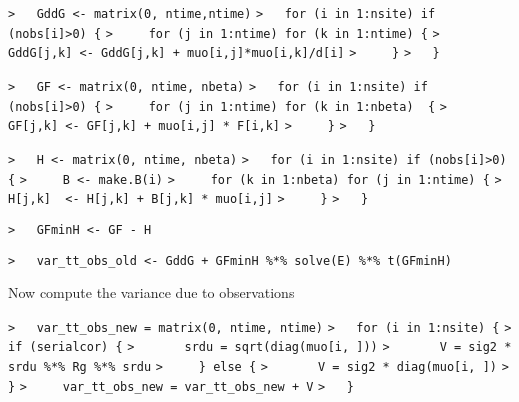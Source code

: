 \documentclass[a4paper]{article}
\begin{document}
\verb~>   GddG <- matrix(0, ntime,ntime)~\newline
\verb~>   for (i in 1:nsite) if (nobs[i]>0) {~\newline
\verb~>     for (j in 1:ntime) for (k in 1:ntime) {~\newline
\verb~>       GddG[j,k] <- GddG[j,k] + muo[i,j]*muo[i,k]/d[i]~\newline
\verb~>     }~\newline
\verb~>   }~\par

\verb~>   GF <- matrix(0, ntime, nbeta)~\newline
\verb~>   for (i in 1:nsite) if (nobs[i]>0) {~\newline
\verb~>     for (j in 1:ntime) for (k in 1:nbeta)  {~\newline
\verb~>       GF[j,k] <- GF[j,k] + muo[i,j] * F[i,k]~\newline
\verb~>     }~\newline
\verb~>   }~\par

\verb~>   H <- matrix(0, ntime, nbeta)~\newline
\verb~>   for (i in 1:nsite) if (nobs[i]>0) {~\newline
\verb~>     B <- make.B(i)~\newline
\verb~>     for (k in 1:nbeta) for (j in 1:ntime) {~\newline
\verb~>       H[j,k]  <- H[j,k] + B[j,k] * muo[i,j]~\newline
\verb~>     }~\newline
\verb~>   }~\par

\verb~>   GFminH <- GF - H~\par

\verb~>   var_tt_obs_old <- GddG + GFminH %*% solve(E) %*% t(GFminH)~\par

Now compute the variance due to observations\par
\verb~>   var_tt_obs_new = matrix(0, ntime, ntime)~\newline
\verb~>   for (i in 1:nsite) {~\newline
\verb~>     if (serialcor) {~\newline
\verb~>       srdu = sqrt(diag(muo[i, ]))~\newline
\verb~>       V = sig2 * srdu %*% Rg %*% srdu~\newline
\verb~>     } else {~\newline
\verb~>       V = sig2 * diag(muo[i, ])~\newline
\verb~>     }~\newline
\verb~>     var_tt_obs_new = var_tt_obs_new + V~\newline
\verb~>   }~\par
\end{document}

